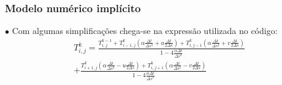 \documentclass[xcolor=dvipsnames,10pt,aspectratio=169]{beamer}
\begin{document}
	\begin{frame} 
	\frametitle{Modelo numérico implícito}
	$\bullet$ Com algumas simplificações chega-se na expressão utilizada no código:
	\begin{equation}
	\begin{split}
	T_{i,j}^{k} = \frac{T_{i,j}^{k-1} + T_{i -1, j}^{k} \left( \alpha \frac{\Delta t}{\Delta s^2} + u \frac{\Delta t}{2 \Delta s} \right) 	+ T_{i,j-1}^{k} \left( \alpha \frac{\Delta t}{\Delta s^2} + v \frac{\Delta t}{2 \Delta s} \right)}{ 1 - 4 \frac{\alpha \Delta t}{\Delta s ^2}} \\
    + \frac{  T_{i+1,j}^{k} \left( \alpha \frac{\Delta t}{ \Delta s^2} - u \frac{\Delta t}{2 \Delta s}\right) 
	+  T_{i,j+1}^{k} \left( \alpha \frac{\Delta t}{\Delta s^2} - v \frac{\Delta t}{2 \Delta s}\right)}{ 1 - 4 \frac{\alpha \Delta t}{\Delta s ^2}}
	\end{split}
	\end{equation}
	
	\end{frame}
	
	
	
	
	
\end{document}
